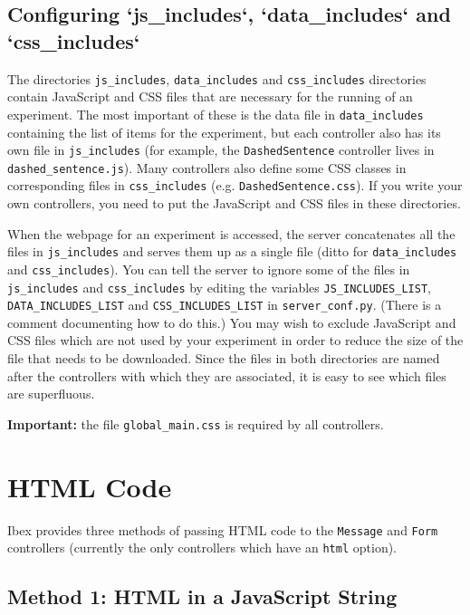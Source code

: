 \documentclass[11pt,letterpaper]{article}
\begin{document}
\normalsize

\subsection{Configuring `js\_includes`, `data\_includes` and `css\_includes`}

The directories \texttt{js\_includes}, \texttt{data\_includes} and \texttt{css\_includes} directories
contain JavaScript and CSS files that are necessary for the running of an
experiment.  The most important of these is the data file in \texttt{data\_includes}
containing the list of items for the experiment, but each controller also has
its own file in \texttt{js\_includes} (for example, the \texttt{DashedSentence} controller
lives in \texttt{dashed\_sentence.js}).  Many controllers also define some CSS classes
in corresponding files in \texttt{css\_includes} (e.g. \texttt{DashedSentence.css}). If you
write your own controllers, you need to put the JavaScript and CSS files in
these directories.

When the webpage for an experiment is accessed, the server concatenates all the
files in \texttt{js\_includes} and serves them up as a single file (ditto for
\texttt{data\_includes} and \texttt{css\_includes}). You can tell the server to ignore some of
the files in \texttt{js\_includes} and \texttt{css\_includes} by editing the variables
\texttt{JS\_INCLUDES\_LIST}, \texttt{DATA\_INCLUDES\_LIST} and \texttt{CSS\_INCLUDES\_LIST} in
\texttt{server\_conf.py}.  (There is a comment documenting how to do this.) You may
wish to exclude JavaScript and CSS files which are not used by your experiment
in order to reduce the size of the file that needs to be downloaded. Since the
files in both directories are named after the controllers with which they are
associated, it is easy to see which files are superfluous.

\textbf{Important:} the file \texttt{global\_main.css} is required by all
controllers.

\section{HTML Code}

Ibex provides three methods of passing HTML code to the \texttt{Message} and \texttt{Form} controllers
(currently the only controllers which have an \texttt{html} option).

\subsection{Method 1: HTML in a JavaScript String}
\end{document}
